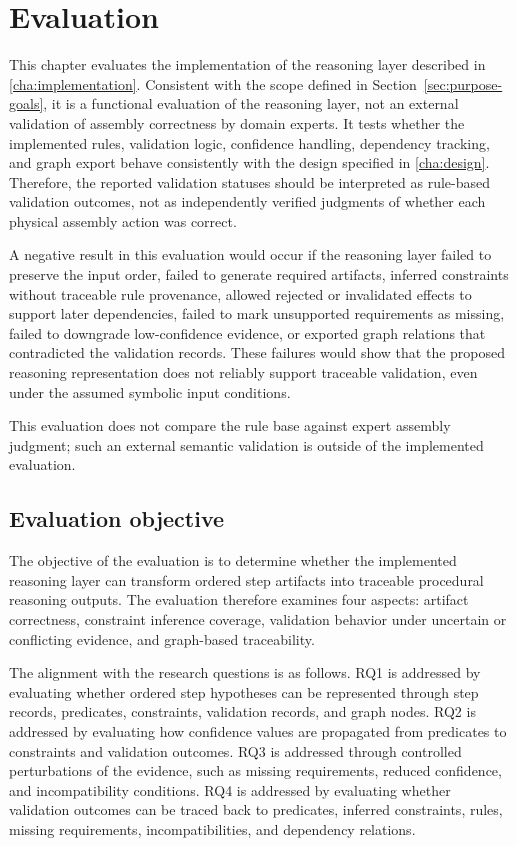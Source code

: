 
\chapter{Evaluation}
\label{cha:evaluation}

This chapter evaluates the implementation of the reasoning layer described in \cref{cha:implementation}. Consistent with the scope defined in Section~\ref{sec:purpose-goals}, it is a functional evaluation of the reasoning layer, not an external validation of assembly correctness by domain experts. It tests whether the implemented rules, validation logic, confidence handling, dependency tracking, and graph export behave consistently with the design specified in \cref{cha:design}. Therefore, the reported validation statuses should be interpreted as rule-based validation outcomes, not as independently verified judgments of whether each physical assembly action was correct.

A negative result in this evaluation would occur if the reasoning layer failed to preserve the input order, failed to generate required artifacts, inferred constraints without traceable rule provenance, allowed rejected or invalidated effects to support later dependencies, failed to mark unsupported requirements as missing, failed to downgrade low-confidence evidence, or exported graph relations that contradicted the validation records. These failures would show that the proposed reasoning representation does not reliably support traceable validation, even under the assumed symbolic input conditions.

This evaluation does not compare the rule base against expert assembly judgment; such an external semantic validation is outside of the implemented evaluation.


\section{Evaluation objective}
\label{sec:evaluation-objective}

The objective of the evaluation is to determine whether the implemented reasoning
layer can transform ordered step artifacts into traceable procedural reasoning
outputs. The evaluation therefore examines four aspects: artifact correctness,
constraint inference coverage, validation behavior under uncertain or conflicting
evidence, and graph-based traceability.

The alignment with the research questions is as follows. RQ1 is addressed by evaluating whether ordered step hypotheses can be represented through step records, predicates, constraints, validation records, and graph nodes. RQ2 is addressed by evaluating how confidence values are propagated from predicates to constraints and validation outcomes. RQ3 is addressed through controlled perturbations of the evidence, such as missing requirements, reduced confidence, and incompatibility conditions. RQ4 is addressed by evaluating whether validation outcomes can be traced back to predicates, inferred constraints, rules, missing requirements, incompatibilities, and dependency relations.

